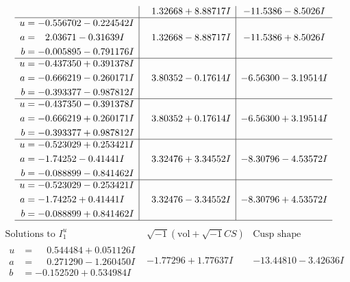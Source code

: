 \documentclass[1p]{elsarticle_modified}
\theoremstyle{definition}
\newcommand{\I}{\sqrt{-1}}
\begin{document}
$$\begin{array}{c|c|c}
 & \phantom{-}1.32668 + 8.88717 I & -11.5386 - 8.5026 I \\ \hline\begin{aligned}
u &= -0.556702 - 0.224542 I \\
a &= \phantom{-}2.03671 - 0.31639 I \\
b &= -0.005895 - 0.791176 I\end{aligned}
 & \phantom{-}1.32668 - 8.88717 I & -11.5386 + 8.5026 I \\ \hline\begin{aligned}
u &= -0.437350 + 0.391378 I \\
a &= -0.666219 - 0.260171 I \\
b &= -0.393377 - 0.987812 I\end{aligned}
 & \phantom{-}3.80352 - 0.17614 I & -6.56300 - 3.19514 I \\ \hline\begin{aligned}
u &= -0.437350 - 0.391378 I \\
a &= -0.666219 + 0.260171 I \\
b &= -0.393377 + 0.987812 I\end{aligned}
 & \phantom{-}3.80352 + 0.17614 I & -6.56300 + 3.19514 I \\ \hline\begin{aligned}
u &= -0.523029 + 0.253421 I \\
a &= -1.74252 - 0.41441 I \\
b &= -0.088899 - 0.841462 I\end{aligned}
 & \phantom{-}3.32476 + 3.34552 I & -8.30796 - 4.53572 I \\ \hline\begin{aligned}
u &= -0.523029 - 0.253421 I \\
a &= -1.74252 + 0.41441 I \\
b &= -0.088899 + 0.841462 I\end{aligned}
 & \phantom{-}3.32476 - 3.34552 I & -8.30796 + 4.53572 I\\
 \hline 
 \end{array}$$\newpage$$\begin{array}{c|c|c}  
\text{Solutions to }I^u_{1}& \I (\text{vol} + \sqrt{-1}CS) & \text{Cusp shape}\\
 \hline 
\begin{aligned}
u &= \phantom{-}0.544484 + 0.051126 I \\
a &= \phantom{-}0.271290 - 1.260450 I \\
b &= -0.152520 + 0.534984 I\end{aligned}
 & -1.77296 + 1.77637 I & -13.44810 - 3.42636 I \\ \hline\begin{aligned}

\end{aligned}
\end{array}$$
\end{document}
